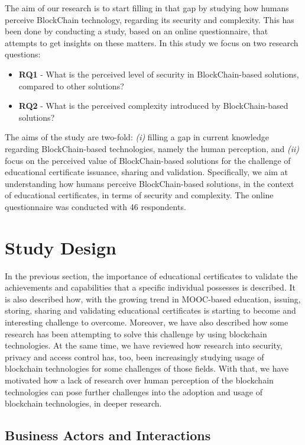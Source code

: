 The aim of our research is to start filling in that gap by studying how humans perceive BlockChain technology, regarding its security and complexity. This has been done by conducting a study, based on an online questionnaire, that attempts to get insights on these matters. In this study we focus on two research questions:
  
\begin{itemize}
    \item \textbf{RQ1} - What is the perceived level of security in BlockChain-based solutions, compared to other solutions?
    \item \textbf{RQ2} - What is the perceived complexity introduced by BlockChain-based solutions?
\end{itemize}

The aims of the study are two-fold: \emph{(i)} filling a gap in current knowledge regarding BlockChain-based technologies, namely the human perception, and \emph{(ii)} focus on the perceived value of BlockChain-based solutions for the challenge of educational certificate issuance, sharing and validation. Specifically, we aim at understanding how humans perceive BlockChain-based solutions, in the context of educational certificates, in terms of security and complexity. The online questionnaire was conducted with 46 respondents.
  
\section{Study Design}

In the previous section, the importance of educational certificates to validate the achievements and capabilities that a specific individual possesses is described. It is also described how, with the growing trend in MOOC-based education, issuing, storing, sharing and validating educational certificates is starting to become and interesting challenge to overcome. Moreover, we have also described how some research has been attempting to solve this challenge by using blockchain technologies. At the same time, we have reviewed how research into security, privacy and access control has, too, been increasingly studying usage of blockchain technologies for some challenges of those fields. With that, we have motivated how a lack of research over human perception of the blockchain technologies can pose further challenges into the adoption and usage of blockchain technologies, in deeper research.
  
\subsection{Business Actors and Interactions}

